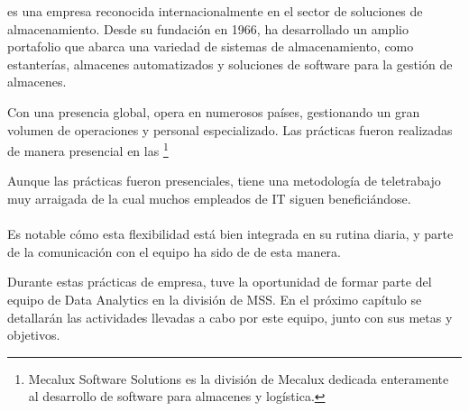 

\href{https://www.mecalux.es/}{} es una empresa reconocida internacionalmente en el sector de soluciones de almacenamiento. Desde su fundación en 1966, ha desarrollado un amplio portafolio que abarca una variedad de sistemas de almacenamiento, como estanterías, almacenes automatizados y soluciones de software para la gestión de almacenes. 

Con una presencia global, \href{https://www.mecalux.es/}{} opera en numerosos países, gestionando un gran volumen de operaciones y personal especializado. Las prácticas fueron realizadas de manera presencial en las \href{https://maps.app.goo.gl/bJKvSNHAo5t1j4BZ6}{}\footnote{Mecalux Software Solutions es la división de Mecalux dedicada enteramente al desarrollo de software para almacenes y logística.}

\begin{notebox}
  Aunque las prácticas fueron presenciales, \href{https://www.mecalux.es/}{} tiene una metodología de teletrabajo muy arraigada de la cual muchos empleados de IT siguen beneficiándose. \\ \\
  Es notable cómo esta flexibilidad está bien integrada en su rutina diaria, y parte de la comunicación con el equipo ha sido de de esta manera.
\end{notebox}

Durante estas prácticas de empresa, tuve la oportunidad de formar parte del equipo de Data Analytics en la división de MSS. En el próximo capítulo se detallarán las actividades llevadas a cabo por este equipo, junto con sus metas y objetivos.

